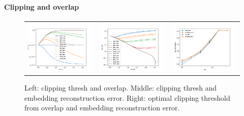 \paragraph{Clipping and overlap} 
\begin{figure}
\begin{tabular}{c c c}
	\includegraphics[width=0.3\linewidth]{figures/micro_overlap_and_clipping.pdf} &
	\includegraphics[width=0.3\linewidth]{figures/micro_rec_loss_and_clipping.pdf} &
	\includegraphics[width=0.3\linewidth]{figures/optimal_clip_thresh_and_bits.pdf} 
\end{tabular}
\label{fig:clipping_effect}
\caption{Left: clipping thresh and overlap. Middle: clipping thresh and embedding reconstruction error. Right: optimal clipping threshold from overlap and embedding reconstruction error.}	
\end{figure}

